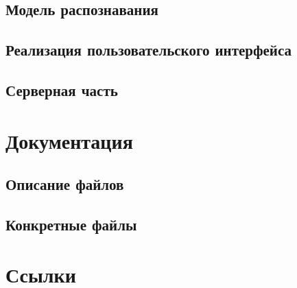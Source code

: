 \documentclass[14pt,a4paper]{article}
\begin{document}
\subsection{Модель распознавания}
\subsection{Реализация пользовательского интерфейса}
\subsection{Серверная часть}

\newpage

\section{Документация}
\subsection{Описание файлов}
\subsection{Конкретные файлы}

\newpage

\section{Ссылки}
\end{document}
